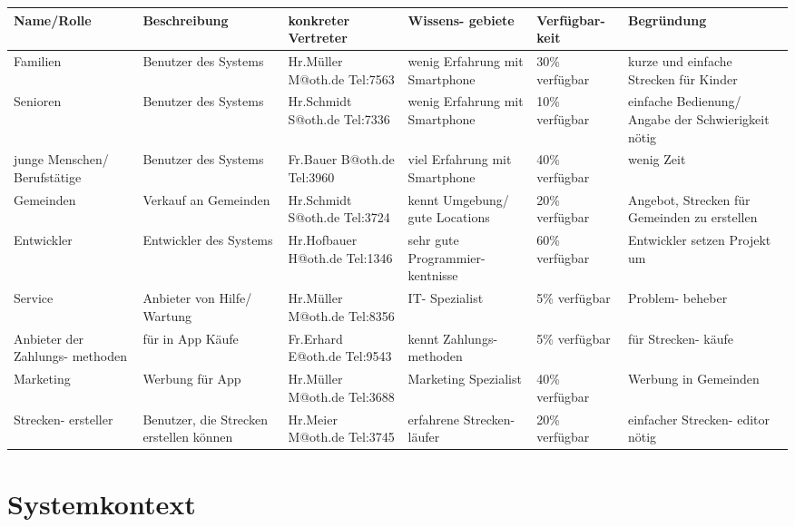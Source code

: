 \documentclass[a4paper, 12pp]{article}
\begin{document}
\begin{center}


\begin{tabular}{|p{2cm}|p{2cm}|p{2cm}|p{2cm}|p{2cm}|p{2cm}|}
\hline
Name/Rolle & Beschreibung & konkreter Vertreter & Wissens- gebiete & Verfügbar- keit & Begründung\\ \hline
Familien & Benutzer des Systems & Hr.Müller M@oth.de Tel:7563& wenig Erfahrung mit Smartphone & 30\% verfügbar & kurze und einfache Strecken für Kinder\\ \hline
Senioren & Benutzer des Systems & Hr.Schmidt S@oth.de Tel:7336 & wenig Erfahrung mit Smartphone & 10\% verfügbar & einfache Bedienung/ Angabe der Schwierigkeit nötig\\ \hline
junge Menschen/ Berufstätige & Benutzer des Systems & Fr.Bauer B@oth.de Tel:3960& viel Erfahrung mit Smartphone & 40\% verfügbar & wenig Zeit\\ \hline
Gemeinden & Verkauf an Gemeinden & Hr.Schmidt S@oth.de Tel:3724& kennt Umgebung/ gute Locations & 20\% verfügbar & Angebot, Strecken für Gemeinden zu erstellen\\ \hline
Entwickler & Entwickler des Systems & Hr.Hofbauer H@oth.de Tel:1346& sehr gute Programmier- kentnisse & 60\% verfügbar & Entwickler setzen Projekt um\\ \hline
Service & Anbieter von Hilfe/ Wartung & Hr.Müller M@oth.de Tel:8356& IT- Spezialist & 5\% verfügbar & Problem- beheber\\ \hline
Anbieter der Zahlungs- methoden & für in App Käufe & Fr.Erhard E@oth.de Tel:9543 & kennt Zahlungs- methoden & 5\% verfügbar & für Strecken- käufe\\ \hline
Marketing & Werbung für App & Hr.Müller M@oth.de Tel:3688 & Marketing Spezialist & 40\% verfügbar & Werbung in Gemeinden\\ \hline
Strecken- ersteller & Benutzer, die Strecken erstellen können & Hr.Meier M@oth.de Tel:3745& erfahrene Strecken- läufer & 20\% verfügbar & einfacher Strecken- editor nötig\\ \hline
\hline

\end{tabular}
\end{center}

\section{Systemkontext}

\begin{figure}[H] 
\centering
	\fbox{\begin{minipage}{13cm} 
	\end{minipage}}

	
\end{figure}
\end{document}
